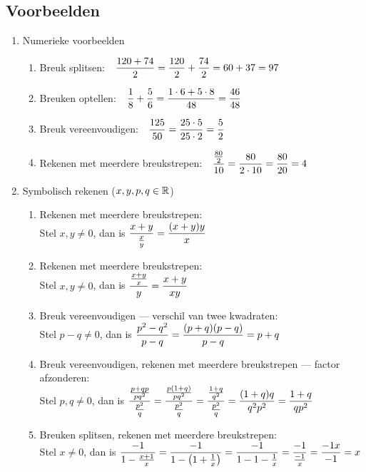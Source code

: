 \documentclass[numbers]{ximera}
\begin{document}
\subsection{Voorbeelden}
\begin{enumerate}
	\item Numerieke voorbeelden
	\begin{enumerate}
		\item Breuk splitsen:\ \ $\displaystyle{\frac{120+74}{2}=\frac{120}{2}+\frac{74}{2}=60+37=97}$
		\item Breuken optellen:\ \ $\displaystyle{\frac{1}{8}+\frac{5}{6}=\frac{1 \cdot 6+5 \cdot 8}{48}=\frac{46}{48}}$
		\item Breuk vereenvoudigen:\ \ $\displaystyle{\frac{125}{50}=\frac{25 \cdot 5}{25 \cdot 2}=\frac{5}{2}}$
		\item Rekenen met meerdere breukstrepen:\ \ $\displaystyle{\frac{\frac{80}{2}}{10}=\frac{80}{2\cdot10}=\frac{80}{20}=4}$
	\end{enumerate}
	
	\item Symbolisch rekenen ($x,y,p,q\in\mathbb{R}$)
	\begin{enumerate}
		\item Rekenen met meerdere breukstrepen:\\
		Stel $x,y \neq 0$, dan is $\displaystyle{\frac{x+y}{\frac{x}{y}}=\frac{(x+y)y}{x}}$
		\item Rekenen met meerdere breukstrepen:\\
		Stel $x,y \neq 0$, dan is $\ds{\frac{\frac{x+y}{x}}{\ y\ }=\frac{x+y}{xy}}$
		\item Breuk vereenvoudigen --- verschil van twee kwadraten:\\
		Stel $p-q \neq 0$, dan is $\displaystyle{\frac{p^{2}-q^{2}}{p-q}=\frac{(p+q)(p-q)}{p-q}=p+q}$
		\item Breuk vereenvoudigen, rekenen met meerdere breukstrepen --- factor afzonderen:\\
		Stel $p,q \neq 0$, dan is $\displaystyle{\frac{\frac{p+qp}{pq^{2}}}{\frac{p^{2}}{q}}=\frac{\frac{p(1+q)}{pq^{2}}}{\frac{p^{2}}{q}}=
			\frac{\frac{1+q}{q^{2}}}{\frac{p^{2}}{q}}=\frac{(1+q)q}{q^{2}p^2}=\frac{1+q}{qp^{2}}}$
		\item Breuken splitsen, rekenen met meerdere breukstrepen:\\
		Stel $x \neq 0$, dan is $\displaystyle{\frac{-1}{1-\frac{x+1}{x}}=\frac{-1}{1-\left(1+\frac{1}{x}\right)}=\frac{-1}{1-1-\frac{1}{x}}=\frac{-1}{\frac{-1}{x}}=\frac{-1x}{-1}=x}$
	\end{enumerate}
\end{enumerate}
\end{document}
